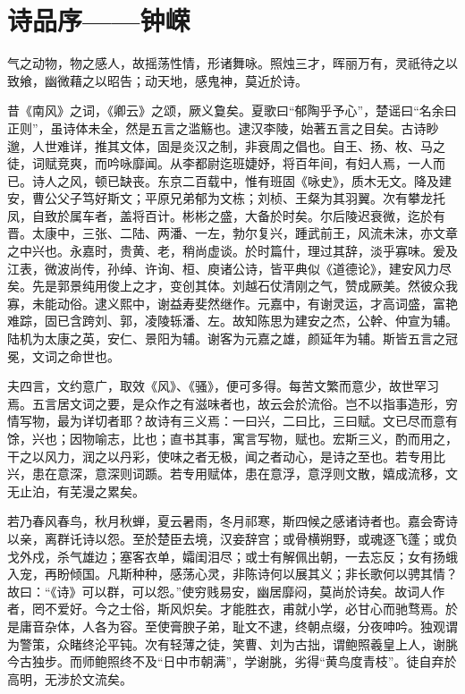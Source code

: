 \section{诗品序——钟嵘}

气之动物，物之感人，故摇荡性情，形诸舞咏。照烛三才，晖丽万有，灵祇待之以致飨，幽微藉之以昭告；动天地，感鬼神，莫近於诗。

昔《南风》之词，《卿云》之颂，厥义敻矣。夏歌曰“郁陶乎予心”，楚谣曰“名余曰正则”，虽诗体未全，然是五言之滥觞也。逮汉李陵，始著五言之目矣。古诗眇邈，人世难详，推其文体，固是炎汉之制，非衰周之倡也。自王、扬、枚、马之徒，词赋竞爽，而吟咏靡闻。从李都尉迄班婕妤，将百年间，有妇人焉，一人而已。诗人之风，顿已缺丧。东京二百载中，惟有班固《咏史》，质木无文。降及建安，曹公父子笃好斯文；平原兄弟郁为文栋；刘桢、王粲为其羽翼。次有攀龙托凤，自致於属车者，盖将百计。彬彬之盛，大备於时矣。尔后陵迟衰微，迄於有晋。太康中，三张、二陆、两潘、一左，勃尔复兴，踵武前王，风流未沫，亦文章之中兴也。永嘉时，贵黄、老，稍尚虚谈。於时篇什，理过其辞，淡乎寡味。爰及江表，微波尚传，孙绰、许询、桓、庾诸公诗，皆平典似《道德论》，建安风力尽矣。先是郭景纯用俊上之才，变创其体。刘越石仗清刚之气，赞成厥美。然彼众我寡，未能动俗。逮义熙中，谢益寿斐然继作。元嘉中，有谢灵运，才高词盛，富艳难踪，固已含跨刘、郭，凌陵轹潘、左。故知陈思为建安之杰，公幹、仲宣为辅。陆机为太康之英，安仁、景阳为辅。谢客为元嘉之雄，颜延年为辅。斯皆五言之冠冕，文词之命世也。

夫四言，文约意广，取效《风》、《骚》，便可多得。每苦文繁而意少，故世罕习焉。五言居文词之要，是众作之有滋味者也，故云会於流俗。岂不以指事造形，穷情写物，最为详切者耶？故诗有三义焉：一曰兴，二曰比，三曰赋。文已尽而意有馀，兴也；因物喻志，比也；直书其事，寓言写物，赋也。宏斯三义，酌而用之，干之以风力，润之以丹彩，使味之者无极，闻之者动心，是诗之至也。若专用比兴，患在意深，意深则词踬。若专用赋体，患在意浮，意浮则文散，嬉成流移，文无止泊，有芜漫之累矣。

若乃春风春鸟，秋月秋蝉，夏云暑雨，冬月祁寒，斯四候之感诸诗者也。嘉会寄诗以亲，离群讬诗以怨。至於楚臣去境，汉妾辞宫；或骨横朔野，或魂逐飞蓬；或负戈外戍，杀气雄边；塞客衣单，孀闺泪尽；或士有解佩出朝，一去忘反；女有扬蛾入宠，再盼倾国。凡斯种种，感荡心灵，非陈诗何以展其义；非长歌何以骋其情？故曰：“《诗》可以群，可以怨。”使穷贱易安，幽居靡闷，莫尚於诗矣。故词人作者，罔不爱好。今之士俗，斯风炽矣。才能胜衣，甫就小学，必甘心而驰骛焉。於是庸音杂体，人各为容。至使膏腴子弟，耻文不逮，终朝点缀，分夜呻吟。独观谓为警策，众睹终沦平钝。次有轻薄之徒，笑曹、刘为古拙，谓鲍照羲皇上人，谢朓今古独步。而师鲍照终不及“日中市朝满”，学谢朓，劣得“黄鸟度青枝”。徒自弃於高明，无涉於文流矣。

